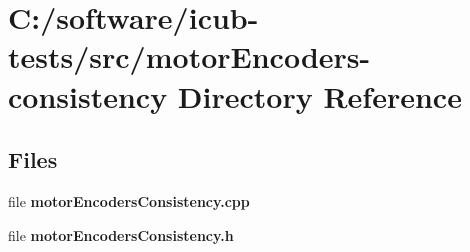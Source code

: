 \section{C\+:/software/icub-\/tests/src/motor\+Encoders-\/consistency Directory Reference}
\label{dir_ff120bfd69174aceba0b7c2c1b4a03e3}
\subsection*{Files}
\begin{DoxyCompactItemize}
\item 
file {\bfseries motor\+Encoders\+Consistency.\+cpp}
\item 
file {\bfseries motor\+Encoders\+Consistency.\+h}
\end{DoxyCompactItemize}
